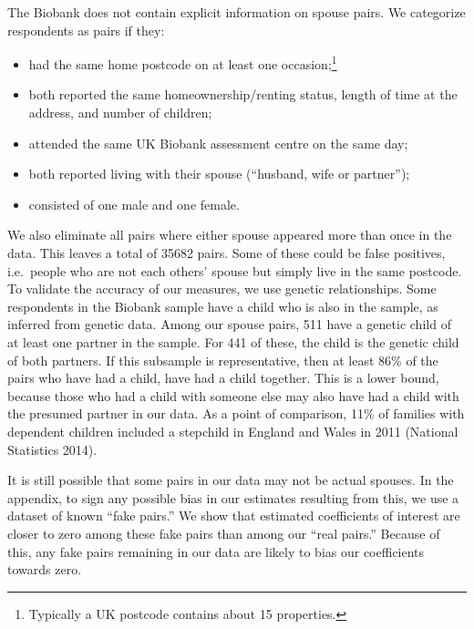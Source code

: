 \documentclass[
]{article}
\providecommand{\tightlist}{%
  \setlength{\itemsep}{0pt}\setlength{\parskip}{0pt}}
\begin{document}
The Biobank does not contain explicit information on spouse pairs. We
categorize respondents as pairs if they:

\begin{itemize}
\tightlist
\item
  had the same home postcode on at least one occasion;\footnote{Typically a UK postcode contains about 15 properties.}
\item
  both reported the same homeownership/renting status, length of time
  at the address, and number of children;
\item
  attended the same UK Biobank assessment centre on the same day;
\item
  both reported living with their spouse (``husband, wife or partner'');
\item
  consisted of one male and one female.
\end{itemize}

We also eliminate all pairs where either spouse appeared more than once
in the data. This leaves a total of 35682 pairs. Some of
these could be false positives, i.e.~people who are not each others'
spouse but simply live in the same postcode. To validate the accuracy of
our measures, we use genetic relationships. Some respondents in the
Biobank sample have a child who is also in the sample, as inferred from
genetic data. Among our spouse pairs, 511 have a genetic
child of at least one partner in the sample. For 441 of
these, the child is the genetic child of both partners. If this
subsample is representative, then at least
86\% of the pairs who have had a
child, have had a child together. This is a lower bound, because those
who had a child with someone else may also have had a child with the
presumed partner in our data. As a point of comparison, 11\% of families
with dependent children included a stepchild in England and Wales in
2011 (National Statistics 2014).

It is still possible that some pairs in our data may not be actual
spouses. In the appendix, to sign any possible bias in our estimates
resulting from this, we use a dataset of known ``fake pairs.'' We show
that estimated coefficients of interest are closer to zero among these
fake pairs than among our ``real pairs.'' Because of this, any fake pairs
remaining in our data are likely to bias our coefficients towards zero.
\end{document}
